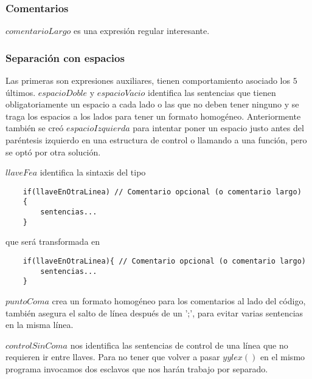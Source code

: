 \documentclass[11pt,spanish]{article} %
\begin{document}
\subsubsection{Comentarios}

$comentarioLargo$ es una expresión regular interesante.

\vspace{0.4cm}
\subsubsection{Separación con espacios}

Las primeras son expresiones auxiliares, tienen comportamiento asociado los $5$ últimos.
$espacioDoble$ y $espacioVacio$ identifica las sentencias que tienen obligatoriamente un espacio a cada lado o las que no deben tener ninguno y se traga los espacios a los lados para tener un formato homogéneo.
Anteriormente también se creó $espacioIzquierda$ para intentar poner un espacio justo antes del paréntesis izquierdo en una estructura de control o llamando a una función, pero se optó por otra solución.

$llaveFea$ identifica la sintaxis del tipo
\begin{lstlisting}
	if(llaveEnOtraLinea) // Comentario opcional (o comentario largo)
	{
		sentencias...
	}
\end{lstlisting}
que será transformada en
\begin{lstlisting}
	if(llaveEnOtraLinea){ // Comentario opcional (o comentario largo)
		sentencias...
	}
\end{lstlisting}

\vspace{0.2cm}
$puntoComa$ crea un formato homogéneo para los comentarios al lado del código, también asegura el salto de línea después de un ';', para evitar varias sentencias en la misma línea.

\vspace{0.2cm}
$controlSinComa$ nos identifica las sentencias de control de una línea que no requieren ir entre llaves.
Para no tener que volver a pasar $yylex()$ en el mismo programa invocamos dos esclavos que nos harán trabajo por separado.

\vspace{0.5cm}
\end{document}
